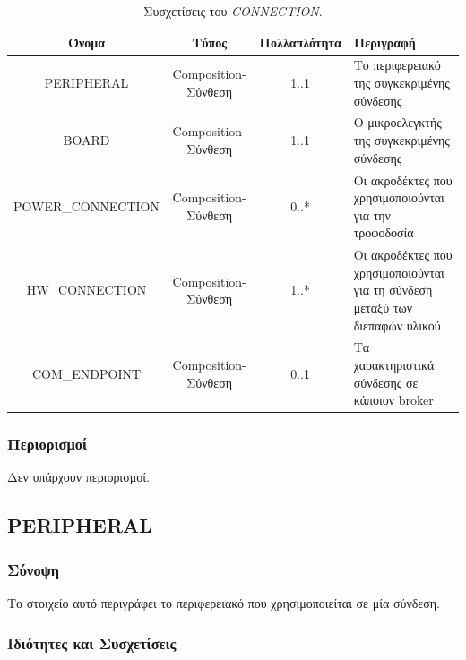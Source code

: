 \begin{table}[H]
	\begin{center}
		\caption{Συσχετίσεις του \textit{CONNECTION}.}
		\label{tab:connection2}
		\begin{tabular}{ | c | c | c| m{5.5cm} | }
			\hline
			\rowcolor{Gray}
			Όνομα & Τύπος & Πολλαπλότητα & Περιγραφή \\
			\hline
			PERIPHERAL & Composition-Σύνθεση & 1..1 &  Το περιφερειακό της συγκεκριμένης σύνδεσης \\
			\hline
			BOARD & Composition-Σύνθεση & 1..1 &  Ο μικροελεγκτής της συγκεκριμένης σύνδεσης \\
			\hline
			\scriptsize{POWER\_CONNECTION} & Composition-Σύνθεση & 0..* &  Οι ακροδέκτες που χρησιμοποιούνται για την τροφοδοσία \\
			\hline
			\footnotesize{HW\_CONNECTION} & Composition-Σύνθεση & 1..* &  Οι ακροδέκτες που χρησιμοποιούνται για τη σύνδεση μεταξύ των διεπαφών υλικού \\
			\hline
			\small{COM\_ENDPOINT} & Composition-Σύνθεση & 0..1 &  Τα χαρακτηριστικά σύνδεσης σε κάποιον broker \\
			\hline
		\end{tabular}
	\end{center}
\end{table}

\subsubsection*{Περιορισμοί}

\noindent Δεν υπάρχουν περιορισμοί.

\subsection{PERIPHERAL}
\label{subsec:peripheral_con}

\subsubsection*{Σύνοψη}

\noindent Το στοιχείο αυτό περιγράφει το περιφερειακό που χρησιμοποιείται σε μία σύνδεση.

\subsubsection*{Ιδιότητες και Συσχετίσεις}

